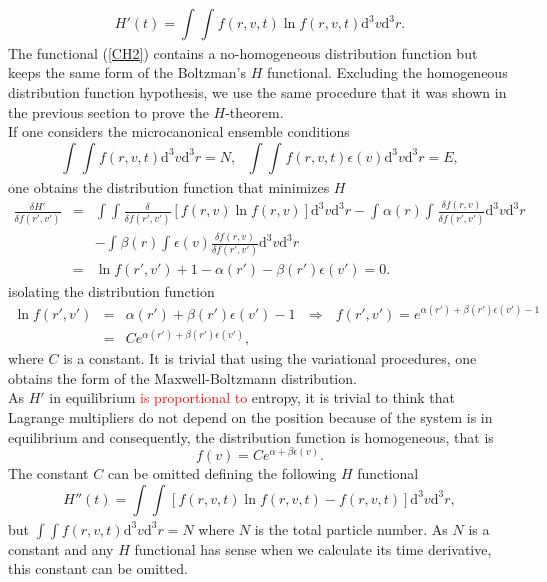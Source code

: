 \documentclass{article}
\begin{document}
\begin{equation}
   H'(t)=\int_{}^{}\int_{}^{} f(r,v,t) \ln f(r,v,t)\mathrm{d}^3v \mathrm{d}^3r \label{CH2}.
\end{equation}
The functional (\ref{CH2}) contains a no-homogeneous distribution function but keeps the same form of the Boltzman's $H$ functional. Excluding the homogeneous distribution function hypothesis, we use the same procedure that it was shown in the previous section to prove the $H$-theorem.\\ 
If one considers the microcanonical ensemble conditions 
\begin{equation}
    \int_{}^{}\int_{}^{}f(r,v,t)\mathrm{d}^3v \mathrm{d}^3r=N, \ \ \ \int_{}^{}\int_{}^{}f(r,v,t)\epsilon(v)\mathrm{d}^3v \mathrm{d}^3r=E \label{micro},
\end{equation}{}
one obtains the distribution function that minimizes $H$
\begin{eqnarray}
\frac{\delta H'}{\delta f(r',v')}&=&\int\int_{}^{}\frac{\delta}{\delta f(r',v')}\left[f(r,v)\ln f(r,v)  \right]\mathrm{d}^3v \mathrm{d}^3r-\int_{}^{}\alpha(r)\int_{}^{}\frac{\delta f(r,v)}{\delta f(r',v')}\mathrm{d}^3v \mathrm{d}^3r\nonumber \\
&&-\int_{}^{}\beta(r) \int_{}^{}\epsilon(v)\frac{\delta f(r,v)}{\delta f(r',v')}\mathrm{d}^3v \mathrm{d}^3r\nonumber \\
&=&\ln f(r',v')+1-\alpha(r')-\beta(r') \epsilon(v')=0.
\end{eqnarray}{}
isolating the distribution function 
\begin{eqnarray}
\ln f(r',v')&=&\alpha(r')+\beta(r') \epsilon(v')-1 \ \ \  \Rightarrow \ \ \ f(r',v')=e^{\alpha(r') +\beta(r') \epsilon(v')-1} \nonumber \\
&=&Ce^{\alpha(r')+\beta(r') \epsilon(v') } \label{relacion1},
\end{eqnarray}{}
where $C$ is a constant. It is trivial that using the variational procedures, one obtains the form of the Maxwell-Boltzmann distribution. \\
As $H'$ in equilibrium \textcolor{red}{is proportional to} entropy, it is trivial to think that Lagrange multipliers do not depend on the position because of the system is in equilibrium and consequently, the distribution function is homogeneous, that is
\begin{equation}
    f(v)=Ce^{\alpha+\beta \epsilon(v)}.
\end{equation}{} 
The constant $C$ can be omitted defining the following $H$ functional
\begin{equation}
   H''(t)=\int_{}^{}\int_{}^{} \left[f(r,v,t) \ln f(r,v,t)-f(r,v,t)\right]\mathrm{d}^3v \mathrm{d}^3r \label{CH3},
\end{equation}{}
  but $\int \int f(r,v,t)\mathrm{d}^3v \mathrm{d}^3r=N$ where $N$ is the total particle number. As $N$ is a constant and any $H$ functional has sense when we calculate its time derivative, this constant can be omitted. 
\end{document}

